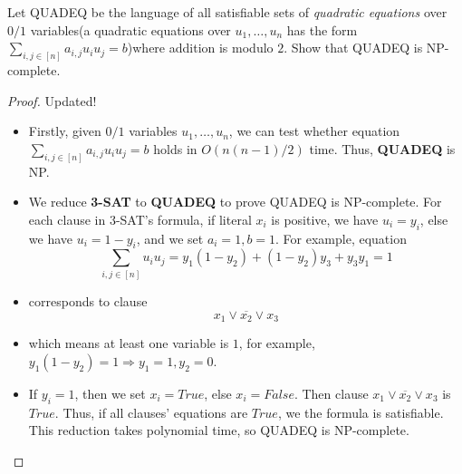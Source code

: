 \documentclass{article}
\newcounter{exercise}
\newcommand{\<}{
    \langle}
\renewcommand{\>}{
    \rangle}
\begin{document}
{\begin{exercise}
Let \textsf{QUADEQ} be the language of all satisfiable sets of \textit{quadratic equations} over $0/1$ variables(a quadratic equations over $u_1,\ldots,u_n$ has the form $\sum_{i,j\in[n]}a_{i,j}u_iu_j=b$)where addition is modulo $2$. Show that \textsf{QUADEQ} is NP-complete.
\end{exercise}
\begin{proof}
    \leavevmode\newline
    {\color{red} Updated!}
    \begin{itemize}
        \item Firstly, given $0/1$ variables $u_1,\ldots,u_n$, we can test whether equation $\sum_{i,j\in[n]}a_{i,j}u_iu_j=b$ holds in $O(n(n-1)/2)$ time. Thus, \textbf{QUADEQ} is NP.
        \item We reduce \textbf{3-SAT} to \textbf{QUADEQ} to prove QUADEQ is NP-complete. For each clause in 3-SAT's formula, if literal $x_i$ is positive, we have $u_i=y_i$, else we have $u_i=1-y_i$, and we set $a_i=1,b=1$. For example, equation
        \begin{displaymath}
            \sum_{i,j\in[n]}u_iu_j=y_1(1-y_2)+(1-y_2)y_3+y_3y_1=1
        \end{displaymath}
        \item corresponds to clause
        \begin{displaymath}
            x_1\vee \overline{x_2}\vee x_3
        \end{displaymath}
        \item which means at least one variable is $1$, for example, $y_1(1-y_2)=1\Rightarrow y_1=1,y_2=0$. 
        \item If $y_i=1$, then we set $x_i=True$, else $x_i=False$. Then clause $x_1\vee \overline{x_2}\vee x_3$ is $True$. Thus, if all clauses' equations are $True$, we the formula is satisfiable. This reduction takes polynomial time, so QUADEQ is NP-complete.
    \end{itemize}
\end{proof}
\newpage


}
\end{document}
